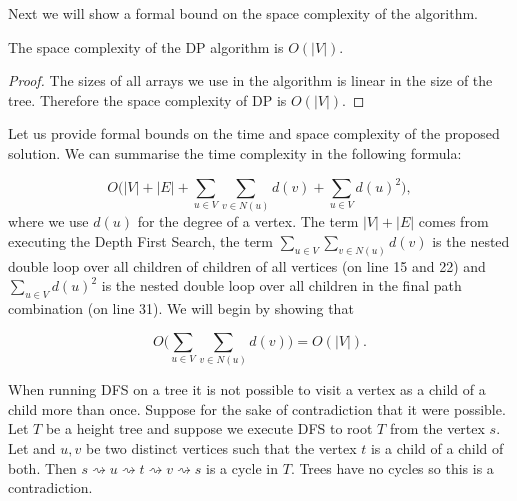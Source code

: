 

Next we will show a formal bound on the space complexity of the algorithm.

\begin{lem} The space complexity of the DP algorithm is $O(|V|)$. \end{lem}

\begin{proof}
    The sizes of all arrays we use in the algorithm is linear in the size of the tree. Therefore the space complexity of DP is $O(|V|)$.
\end{proof}

Let us provide formal bounds on the time and space complexity of the proposed solution. We can summarise the time complexity in the following formula:

$$ O\bigg( |V| + |E| + \sum_{u \in V}{\sum_{v \in N(u)}{d(v)}} + \sum_{u \in V}{d(u)^2}  \bigg) ,$$
where we use $d(u)$ for the degree of a vertex. The term $|V| + |E|$ comes from executing the Depth First Search, the term $\sum_{u \in V}{\sum_{v \in N(u)}{d(v)}}$ is the nested double loop over all children of children of all vertices (on line 15 and 22) and $\sum_{u \in V}{d(u)^2}$ is the nested double loop over all children in the final path combination (on line 31). We will begin by showing that

$$ O\bigg( \sum_{u \in V}{\sum_{v \in N(u)}{d(v)}} \bigg) = O(|V|) .$$

When running DFS on a tree it is not possible to visit a vertex as a child of a child more than once. Suppose for the sake of contradiction that it were possible. Let $T$ be a height tree and suppose we execute DFS to root $T$ from the vertex $s$. Let and $u, v$ be two distinct vertices such that the vertex $t$ is a child of a child of both. Then $s \rightsquigarrow u \rightsquigarrow t \rightsquigarrow v \rightsquigarrow s$ is a cycle in $T$. Trees have no cycles so this is a contradiction.

